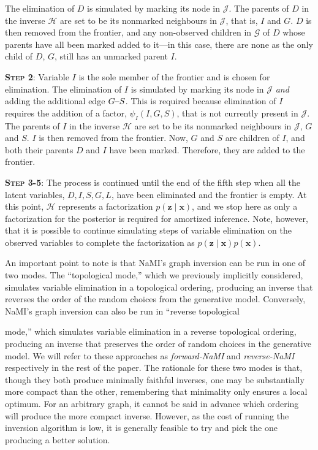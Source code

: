  The elimination of $D$ is simulated by marking its node in $\mathcal{J}$.
The parents of $D$ in the inverse $\mathcal{H}$ are set to be its  nonmarked neighbours in $\mathcal{J}$, that is, $I$ and $G$.
$D$ is then removed from the frontier,  and any non-observed children in $\mathcal{G}$ of $D$ whose parents have all been marked added to it---in this case, there are none as the only child of $D$, $G$, still has an unmarked parent $I$.

\textbf{{\scshape Step 2}}: Variable $I$ is the sole member of the frontier and is chosen for elimination.
The elimination of $I$ is simulated by marking its node in $\mathcal{J}$ \emph{and} adding the additional edge $G\hbox{--}S$.
This is required because elimination of $I$ requires the addition of a factor, $\psi_I(I,G,S)$, that is not currently present in $\mathcal{J}$.
The parents of $I$ in the inverse $\mathcal{H}$ are set to be its nonmarked neighbours in $\mathcal{J}$, $G$ and $S$.
$I$ is then removed from the frontier.
Now, $G$ and $S$ are children of $I$, and both their parents $D$ and $I$	have been marked.
Therefore, they are added to the frontier.

\textbf{{\scshape Step 3-5}}: The process is continued until the end of the fifth step when all the latent variables, $D,I,S,G,L$, have been eliminated and the frontier is empty.
At this point, $\mathcal{H}$ represents a factorization $p(\mathbf{z}\mid\mathbf{x})$, and we stop here as only a factorization for the posterior is required for amortized inference. Note, however, that it is possible to continue simulating steps of variable elimination on the observed variables to complete the factorization as $p(\mathbf{z}\mid\mathbf{x})p(\mathbf{x})$.

An important point to note is that NaMI's graph inversion can be run in one of two modes. The ``topological mode,'' which we previously implicitly considered, simulates variable elimination in a topological ordering, producing an inverse that reverses the order of the random choices from the generative model.
Conversely, NaMI's graph inversion can also be run in ``reverse topological

mode,'' which simulates variable elimination in a reverse topological ordering, producing an inverse that preserves the order of random choices in
the generative model.
We will refer to these approaches as \emph{forward-NaMI} and \emph{reverse-NaMI} respectively in the rest of the paper.
The rationale for these two modes is that, though they both produce minimally faithful inverses, one may be substantially more compact than the other, remembering that minimality only ensures a local optimum.
For an arbitrary graph, it cannot be said in advance which ordering will produce the more compact inverse.
However, as the cost of running the inversion algorithm is low, it is generally feasible to try and pick the one producing a better solution.

